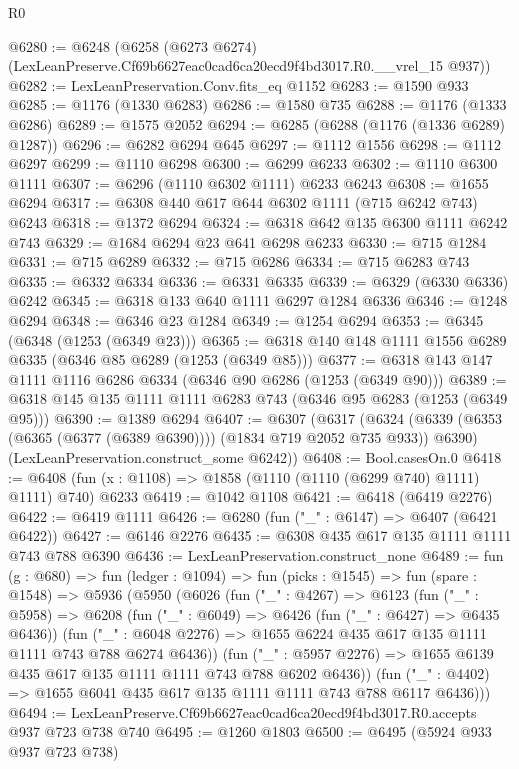 \begin{lexlean}{R0}
\begin{coremodule}
@6280 := @6248
    (@6258 (@6273 @6274) (LexLeanPreserve.Cf69b6627eac0cad6ca20ecd9f4bd3017.R0.__vrel_15 @937))
@6282 := LexLeanPreservation.Conv.fits_eq @1152
@6283 := @1590 @933
@6285 := @1176 (@1330 @6283)
@6286 := @1580 @735
@6288 := @1176 (@1333 @6286)
@6289 := @1575 @2052
@6294 := @6285 (@6288 (@1176 (@1336 @6289) @1287))
@6296 := @6282 @6294 @645
@6297 := @1112 @1556
@6298 := @1112 @6297
@6299 := @1110 @6298
@6300 := @6299 @6233
@6302 := @1110 @6300 @1111
@6307 := @6296 (@1110 @6302 @1111) @6233 @6243
@6308 := @1655 @6294
@6317 := @6308 @440 @617 @644 @6302 @1111 (@715 @6242 @743) @6243
@6318 := @1372 @6294
@6324 := @6318 @642 @135 @6300 @1111 @6242 @743
@6329 := @1684 @6294 @23 @641 @6298 @6233
@6330 := @715 @1284
@6331 := @715 @6289
@6332 := @715 @6286
@6334 := @715 @6283 @743
@6335 := @6332 @6334
@6336 := @6331 @6335
@6339 := @6329 (@6330 @6336) @6242
@6345 := @6318 @133 @640 @1111 @6297 @1284 @6336
@6346 := @1248 @6294
@6348 := @6346 @23 @1284
@6349 := @1254 @6294
@6353 := @6345 (@6348 (@1253 (@6349 @23)))
@6365 := @6318 @140 @148 @1111 @1556 @6289 @6335 (@6346 @85 @6289 (@1253 (@6349 @85)))
@6377 := @6318 @143 @147 @1111 @1116 @6286 @6334 (@6346 @90 @6286 (@1253 (@6349 @90)))
@6389 := @6318 @145 @135 @1111 @1111 @6283 @743 (@6346 @95 @6283 (@1253 (@6349 @95)))
@6390 := @1389 @6294
@6407 := @6307
    (@6317
      (@6324 (@6339 (@6353 (@6365 (@6377 (@6389 @6390)))) (@1834 @719 @2052 @735 @933)) @6390)
      (LexLeanPreservation.construct_some @6242))
@6408 := Bool.casesOn.{0}
@6418 := @6408 (fun (x : @1108) => @1858 (@1110 (@1110 (@6299 @740) @1111) @1111) @740) @6233
@6419 := @1042 @1108
@6421 := @6418 (@6419 @2276)
@6422 := @6419 @1111
@6426 := @6280 (fun ("_" : @6147) => @6407 (@6421 @6422))
@6427 := @6146 @2276
@6435 := @6308 @435 @617 @135 @1111 @1111 @743 @788 @6390
@6436 := LexLeanPreservation.construct_none
@6489 := fun (g : @680) =>
  fun (ledger : @1094) =>
  fun (picks : @1545) =>
  fun (spare : @1548) =>
  @5936
    (@5950
      (@6026
        (fun ("_" : @4267) =>
        @6123
          (fun ("_" : @5958) =>
          @6208
            (fun ("_" : @6049) => @6426 (fun ("_" : @6427) => @6435 @6436))
            (fun ("_" : @6048 @2276) =>
            @1655 @6224 @435 @617 @135 @1111 @1111 @743 @788 @6274 @6436))
          (fun ("_" : @5957 @2276) => @1655 @6139 @435 @617 @135 @1111 @1111 @743 @788 @6202 @6436))
        (fun ("_" : @4402) => @1655 @6041 @435 @617 @135 @1111 @1111 @743 @788 @6117 @6436)))
@6494 := LexLeanPreserve.Cf69b6627eac0cad6ca20ecd9f4bd3017.R0.accepts @937 @723 @738 @740
@6495 := @1260 @1803
@6500 := @6495 (@5924 @933 @937 @723 @738)

\end{coremodule}
\end{lexlean}
